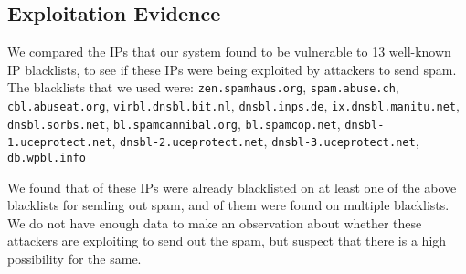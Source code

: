 \subsection{Exploitation Evidence}
We compared the \ips IPs that our system found to be vulnerable to 13 well-known IP blacklists, to see if these IPs were being exploited by attackers to send spam. The blacklists that we used were: 
\texttt{zen.spamhaus.org},
\texttt{spam.abuse.ch},
\texttt{cbl.abuseat.org},
\texttt{virbl.dnsbl.bit.nl},
\texttt{dnsbl.inps.de},
\texttt{ix.dnsbl.manitu.net},
\texttt{dnsbl.sorbs.net},
\texttt{bl.spamcannibal.org},
\texttt{bl.spamcop.net},
\texttt{dnsbl-1.uceprotect.net},
\texttt{dnsbl-2.uceprotect.net},
\texttt{dnsbl-3.uceprotect.net},
\texttt{db.wpbl.info}

We found that \ipsblacklist of these IPs were already blacklisted on at least one of the above blacklists for sending out spam, and \ipsblacklistmulti of them were found on multiple blacklists. We do not have enough data to make an observation about whether these attackers are exploiting \ehi to send out the spam, but suspect that there is a high possibility for the same.